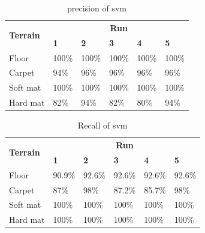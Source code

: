 \documentclass[USenglish]{ifimaster}  %
\begin{document}
\begin{table}[h]
	\centering
	\begin{tabular}{@{}llllll@{}}
		\toprule
		\multirow{2}{*}{\textbf{Terrain}} & \multicolumn{5}{c}{\textbf{Run}} \\ \cmidrule(l){2-6} 
		& \multicolumn{1}{l|}{\textbf{1}} & \multicolumn{1}{l|}{\textbf{2}} & \multicolumn{1}{l|}{\textbf{3}} & \multicolumn{1}{l|}{\textbf{4}} & \textbf{5} \\ \midrule
		\multicolumn{1}{l|}{Floor} & \multicolumn{1}{l|}{100\%} & \multicolumn{1}{l|}{100\%} & \multicolumn{1}{l|}{100\%} & \multicolumn{1}{l|}{100\%} & 100\% \\ \midrule
		\multicolumn{1}{l|}{Carpet} & \multicolumn{1}{l|}{94\%} & \multicolumn{1}{l|}{96\%} & \multicolumn{1}{l|}{96\%} & \multicolumn{1}{l|}{96\%} & 96\% \\ \midrule
		\multicolumn{1}{l|}{Soft mat} & \multicolumn{1}{l|}{100\%} & \multicolumn{1}{l|}{100\%} & \multicolumn{1}{l|}{100\%} & \multicolumn{1}{l|}{100\%} & 100\% \\ \midrule
		\multicolumn{1}{l|}{Hard mat} & \multicolumn{1}{l|}{82\%} & \multicolumn{1}{l|}{94\%} & \multicolumn{1}{l|}{82\%} & \multicolumn{1}{l|}{80\%} & 94\% \\ \bottomrule
	\end{tabular}
	\caption{precision of svm}
	\label{pressvm}
\end{table}
\FloatBarrier

\begin{table}[h]
	\centering
	\begin{tabular}{@{}llllll@{}}
		\toprule
		\multirow{2}{*}{\textbf{Terrain}} & \multicolumn{5}{c}{\textbf{Run}} \\ \cmidrule(l){2-6} 
		& \multicolumn{1}{l|}{\textbf{1}} & \multicolumn{1}{l|}{\textbf{2}} & \multicolumn{1}{l|}{\textbf{3}} & \multicolumn{1}{l|}{\textbf{4}} & \textbf{5} \\ \midrule
		\multicolumn{1}{l|}{Floor} & \multicolumn{1}{l|}{90.9\%} & \multicolumn{1}{l|}{92.6\%} & \multicolumn{1}{l|}{92.6\%} & \multicolumn{1}{l|}{92.6\%} & 92.6\% \\ \midrule
		\multicolumn{1}{l|}{Carpet} & \multicolumn{1}{l|}{87\%} & \multicolumn{1}{l|}{98\%} & \multicolumn{1}{l|}{87.2\%} & \multicolumn{1}{l|}{85.7\%} & 98\% \\ \midrule
		\multicolumn{1}{l|}{Soft mat} & \multicolumn{1}{l|}{100\%} & \multicolumn{1}{l|}{100\%} & \multicolumn{1}{l|}{100\%} & \multicolumn{1}{l|}{100\%} & 100\% \\ \midrule
		\multicolumn{1}{l|}{Hard mat} & \multicolumn{1}{l|}{100\%} & \multicolumn{1}{l|}{100\%} & \multicolumn{1}{l|}{100\%} & \multicolumn{1}{l|}{100\%} & 100\% \\ \bottomrule
	\end{tabular}
	\caption{Recall of svm}
	\label{recallsvm}
\end{table}
\FloatBarrier
\end{document}
